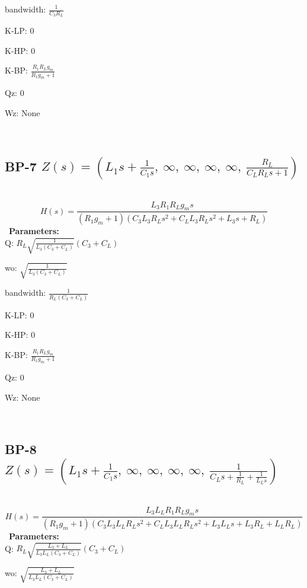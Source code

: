\documentclass{article}
\begin{document}
bandwidth: $\frac{1}{C_{3} R_{L}}$\ 

K-LP: $0$\ 

K-HP: $0$\ 

K-BP: $\frac{R_{1} R_{L} g_{m}}{R_{1} g_{m} + 1}$\ 

Qz: $0$\ 

Wz: $\text{None}$\ 

\ 

\subsection{BP-7 $Z(s) = \left( L_{1} s + \frac{1}{C_{1} s}, \  \infty, \  \infty, \  \infty, \  \infty, \  \frac{R_{L}}{C_{L} R_{L} s + 1}\right)$ } \ 
\textbf{\[H(s) = \frac{L_{3} R_{1} R_{L} g_{m} s}{\left(R_{1} g_{m} + 1\right) \left(C_{3} L_{3} R_{L} s^{2} + C_{L} L_{3} R_{L} s^{2} + L_{3} s + R_{L}\right)}\] } \ 
\textbf{Parameters:}\\ 

Q: $R_{L} \sqrt{\frac{1}{L_{3} \left(C_{3} + C_{L}\right)}} \left(C_{3} + C_{L}\right)$\ 

wo: $\sqrt{\frac{1}{L_{3} \left(C_{3} + C_{L}\right)}}$\ 

bandwidth: $\frac{1}{R_{L} \left(C_{3} + C_{L}\right)}$\ 

K-LP: $0$\ 

K-HP: $0$\ 

K-BP: $\frac{R_{1} R_{L} g_{m}}{R_{1} g_{m} + 1}$\ 

Qz: $0$\ 

Wz: $\text{None}$\ 

\ 

\subsection{BP-8 $Z(s) = \left( L_{1} s + \frac{1}{C_{1} s}, \  \infty, \  \infty, \  \infty, \  \infty, \  \frac{1}{C_{L} s + \frac{1}{R_{L}} + \frac{1}{L_{L} s}}\right)$ } \ 
\textbf{\[H(s) = \frac{L_{3} L_{L} R_{1} R_{L} g_{m} s}{\left(R_{1} g_{m} + 1\right) \left(C_{3} L_{3} L_{L} R_{L} s^{2} + C_{L} L_{3} L_{L} R_{L} s^{2} + L_{3} L_{L} s + L_{3} R_{L} + L_{L} R_{L}\right)}\] } \ 
\textbf{Parameters:}\\ 

Q: $R_{L} \sqrt{\frac{L_{3} + L_{L}}{L_{3} L_{L} \left(C_{3} + C_{L}\right)}} \left(C_{3} + C_{L}\right)$\ 

wo: $\sqrt{\frac{L_{3} + L_{L}}{L_{3} L_{L} \left(C_{3} + C_{L}\right)}}$\ 
\end{document}
